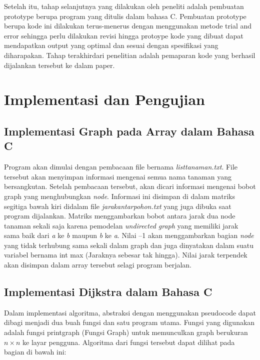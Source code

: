 \documentclass[conference]{IEEEtran}
\begin{document}
Setelah itu, tahap selanjutnya yang dilakukan oleh peneliti adalah pembuatan prototype berupa program yang ditulis dalam bahasa C. Pembuatan prototype berupa kode ini dilakukan terus-menerus dengan menggunakan metode trial and error sehingga perlu dilakukan revisi hingga protoype kode yang dibuat dapat mendapatkan output yang optimal dan sesuai dengan spesiﬁkasi yang diharapakan. Tahap terakhirdari penelitian adalah pemaparan kode yang berhasil dijalankan tersebut ke dalam paper.

\begin{figure}[htbp]
	\centering
	\scalebox{0.26}{}
\end{figure} 

\section{Implementasi dan Pengujian}
\subsection{Implementasi Graph pada Array dalam Bahasa C}
Program akan dimulai dengan pembacaan ﬁle bernama \textit{listtanaman.txt}. File tersebut akan menyimpan informasi mengenai semua nama tanaman yang bersangkutan. Setelah pembacaan tersebut, akan dicari informasi mengenai bobot graph yang menghubungkan \textit{node}. Informasi ini disimpan di dalam matriks segitiga bawah kiri didalam ﬁle \textit{jarakantarpohon.txt} yang juga dibuka saat program dijalankan. Matriks menggambarkan bobot antara jarak dua node tanaman sekali saja karena pemodelan \textit{undirected graph} yang memiliki jarak sama baik dari \textit{a} ke \textit{b} maupun \textit{b} ke \textit{a}. Nilai --1 akan menggambarkan bagian \textit{node} yang tidak terhubung sama sekali dalam graph dan juga dinyatakan dalam suatu variabel bernama int max (Jaraknya sebesar tak hingga). Nilai jarak terpendek akan disimpan dalam array tersebut selagi program berjalan. 

\subsection{Implementasi Dijkstra dalam Bahasa C}
Dalam implementasi algoritma, abstraksi dengan menggunakan pseudocode dapat dibagi menjadi dua buah fungsi dan satu program utama. Fungsi yang digunakan adalah fungsi printgraph (Fungsi Graph) untuk memunculkan graph berukuran $n \times n$ ke layar pengguna. Algoritma dari fungsi tersebut dapat dilihat pada bagian di bawah ini:
\end{document}

